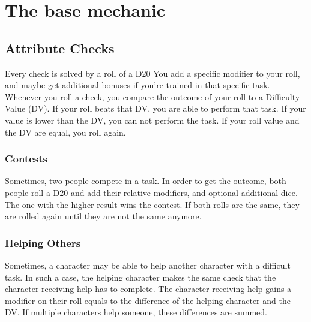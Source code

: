 \chapter{The base mechanic}
\section{Attribute Checks}
Every check is solved by a roll of a D20 You add a specific modifier to your roll, and maybe get additional bonuses if you’re trained in that specific task. Whenever you roll a check, you compare the outcome of your roll to a Difficulty Value (DV). If your roll beats that DV, you are able to perform that task. If your value is lower than the DV, you can not perform the task. If your roll value and the DV are equal, you roll again.

\subsection{Contests}
Sometimes, two people compete in a task. In order to get the outcome, both people roll a D20 and add their relative modifiers, and optional additional dice. The one with the higher result wins the contest. If both rolls are the same, they are rolled again until they are not the same anymore.

\subsection{Helping Others}
Sometimes, a character may be able to help another character with a difficult task. In such a case, the helping character makes the same check that the character receiving help has to complete. The character receiving help gains a modifier on their roll equals to the difference of the helping character and the DV. If multiple characters help someone, these differences are summed.


